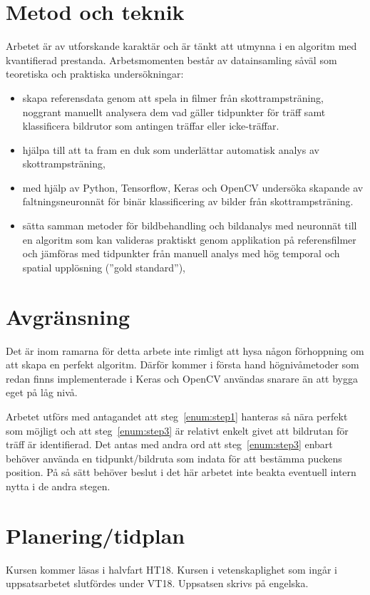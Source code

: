 \documentclass[a4paper,12pt]{article}
\begin{document}
\section*{Metod och teknik}
Arbetet är av utforskande karaktär och är tänkt att utmynna i en algoritm
med kvantifierad prestanda. Arbetsmomenten består av datainsamling såväl
som teoretiska och praktiska undersökningar:
\begin{itemize}
  \item skapa referensdata genom att spela in filmer från skottrampsträning,
    noggrant manuellt analysera dem vad gäller tidpunkter för träff samt
    klassificera bildrutor som antingen träffar eller icke-träffar.
  \item hjälpa till att ta fram en duk som underlättar automatisk analys av
    skottrampsträning,
  \item med hjälp av Python, Tensorflow, Keras och OpenCV undersöka
    skapande av faltningsneuronnät för binär klassificering av bilder
    från skottrampsträning.
  \item sätta samman metoder för bildbehandling och bildanalys med
    neuronnät till en algoritm som kan valideras praktiskt genom applikation
    på referensfilmer och jämföras med tidpunkter från manuell analys med
    hög temporal och spatial upplösning (''gold standard''),
\end{itemize}


\section*{Avgränsning}
Det är inom ramarna för detta arbete inte rimligt att hysa någon förhoppning
om att skapa en perfekt algoritm. Därför kommer i första hand högnivåmetoder
som redan finns implementerade i Keras och OpenCV användas snarare än att
bygga eget på låg nivå.

Arbetet utförs med antagandet att steg~\ref{enum:step1} hanteras så nära
perfekt som möjligt och att steg~\ref{enum:step3} är relativt enkelt givet
att bildrutan för träff är identifierad. Det antas med andra ord att
steg~\ref{enum:step3} enbart behöver använda en tidpunkt/bildruta som indata
för att bestämma puckens position. På så sätt behöver beslut i det här
arbetet inte beakta eventuell intern nytta i de andra stegen.


\pagebreak
\section*{Planering/tidplan}
Kursen kommer läsas i halvfart HT18. Kursen i vetenskaplighet som ingår
i uppsatsarbetet slutfördes under VT18. Uppsatsen skrivs på engelska.
\end{document}
